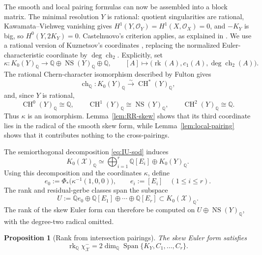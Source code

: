 \documentclass[11pt]{article}
\theoremstyle{plain}
\newtheorem{proposition}[theorem]{Proposition}
\theoremstyle{definition}
\theoremstyle{remark}
\newcommand{\cX}{\mathcal X}
\newcommand{\NS}{\operatorname{NS}}
\newcommand{\rk}{\operatorname{rk}}
\newcommand{\Span}{\operatorname{Span}}
\newcommand{\Q}{\mathbb Q}
\newcommand{\1}{\mathbf 1}
\begin{document}
The smooth and local pairing formulas can now be assembled into a block matrix.  The minimal resolution $Y$ is rational: quotient singularities are rational, Kawamata--Viehweg vanishing gives $H^1(Y,\mathcal O_Y)=H^1(X,\mathcal O_X)=0$, and $-K_Y$ is big, so $H^0(Y,2K_Y)=0$.  Castelnuovo's criterion applies, as explained in \cite[Remark 4.3]{GR}.  We use a rational version of Kuznetsov's coordinates \cite[Example 3.5]{Kuz}, replacing the normalized Euler-characteristic coordinate by $\deg\operatorname{ch}_2$.  Explicitly, set
\[
\kappa:K_0(Y)_{\Q}\longrightarrow
\Q\oplus\NS(Y)_{\Q}\oplus\Q,
\qquad
[A]\longmapsto
\bigl(\rk(A),c_1(A),\deg\operatorname{ch}_2(A)\bigr).
\]
The rational Chern-character isomorphism described by Fulton \cite[Chapter 15]{Fulton} gives
\[
\operatorname{ch}_{\Q}:K_0(Y)_{\Q}\xrightarrow{\sim}
\operatorname{CH}^*(Y)_{\Q},
\]
and, since $Y$ is rational,
\[
\operatorname{CH}^0(Y)_{\Q}\cong\Q,
\qquad
\operatorname{CH}^1(Y)_{\Q}\cong\NS(Y)_{\Q},
\qquad
\operatorname{CH}^2(Y)_{\Q}\cong\Q.
\]
Thus $\kappa$ is an isomorphism.  Lemma~\ref{lem:RR-skew} shows that its third coordinate lies in the radical of the smooth skew form, while Lemma~\ref{lem:local-pairing} shows that it contributes nothing to the cross-pairings.

The semiorthogonal decomposition \eqref{eq:IU-sod} induces
\[
K_0(\cX)_{\Q}
\simeq
\bigoplus_{i=1}^r\Q[E_i]\oplus K_0(Y)_{\Q}.
\]
Using this decomposition and the coordinates $\kappa$, define
\[
e_0:=\Phi_*\bigl(\kappa^{-1}(1,0,0)\bigr),
\qquad
e_i:=[E_i]\quad(1\le i\le r).
\]
The rank and residual-gerbe classes span the subspace
\[
U:=\Q e_0\oplus\Q[E_1]\oplus\cdots\oplus\Q[E_r]
\subset K_0(\cX)_{\Q}.
\]
The rank of the skew Euler form can therefore be computed on $U\oplus\NS(Y)_{\Q}$, with the degree-two radical omitted.

\begin{proposition}[Rank from intersection pairings]\label{prop:rank-span}
The skew Euler form satisfies
\[
\rk_{\Q}\chi^-_{\cX}
=2\dim_{\Q}\Span\{K_Y,C_1,\dots,C_r\}.
\]
\end{proposition}
\end{document}
